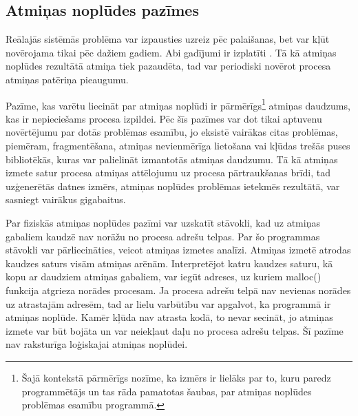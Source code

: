 \subsection{Atmiņas noplūdes pazīmes}

Reālajās sistēmās problēma var izpausties uzreiz pēc palaišanas, bet var kļūt novērojama tikai pēc dažiem gadiem. 
Abi gadījumi ir izplatīti \cite{HTTM}.
Tā kā atmiņas noplūdes rezultātā atmiņa tiek pazaudēta, tad var periodiski novērot procesa atmiņas patēriņa pieaugumu.


Pazīme, kas varētu liecināt par atmiņas noplūdi ir pārmērīgs\footnote{Šajā kontekstā pārmērīgs nozīme, ka izmērs ir lielāks par to, kuru paredz programmētājs un tas rāda pamatotas šaubas, par atmiņas noplūdes problēmas esamību programmā.}
atmiņas daudzums, kas ir nepieciešams procesa izpildei. 
Pēc šīs pazīmes var dot tikai aptuvenu novērtējumu par dotās problēmas esamību, jo eksistē vairākas citas problēmas, piemēram, fragmentēšana, atmiņas nevienmērīga lietošana vai kļūdas trešās puses bibliotēkās, kuras var palielināt izmantotās atmiņas daudzumu.
Tā kā atmiņas izmete satur procesa atmiņas attēlojumu uz procesa pārtraukšanas brīdi, tad uzģenerētās datnes izmērs, atmiņas noplūdes problēmas ietekmēs rezultātā, var sasniegt vairākus gigabaitus.


Par fiziskās atmiņas noplūdes pazīmi var uzskatīt stāvokli, kad uz atmiņas gabaliem kaudzē nav norāžu no procesa adrešu telpas.
Par šo programmas stāvokli var pārliecināties, veicot atmiņas izmetes analīzi. 
Atmiņas izmetē atrodas kaudzes saturs visām atmiņas arēnām. 
Interpretējot katru kaudzes saturu, kā kopu ar daudziem atmiņas gabaliem, var iegūt adreses, uz kuriem malloc() funkcija atgrieza norādes procesam.
Ja procesa adrešu telpā nav nevienas norādes uz atrastajām adresēm, tad ar lielu varbūtību var apgalvot, ka programmā ir atmiņas noplūde.
Kamēr kļūda nav atrasta kodā, to nevar secināt, jo atmiņas izmete var būt bojāta un var neiekļaut daļu no procesa adrešu telpas.
Šī pazīme nav raksturīga loģiskajai atmiņas noplūdei.




